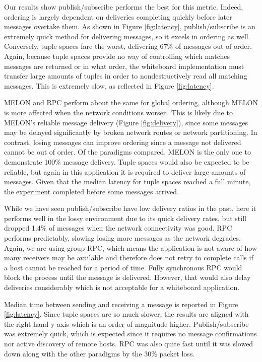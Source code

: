 Our results show publish/subscribe performs the best for this metric. Indeed, ordering is largely dependent on deliveries completing quickly before later messages overtake them. As shown in Figure \ref{fig:latency}, publish/subscribe is an extremely quick method for delivering messages, so it excels in ordering as well. Conversely, tuple spaces fare the worst, delivering 67\% of messages out of order. Again, because tuple spaces provide no way of controlling which matches messages are returned or in what order, the whiteboard implementation must transfer large amounts of tuples in order to nondestructively read all matching messages. This is extremely slow, as reflected in Figure \ref{fig:latency}.

MELON and RPC perform about the same for global ordering, although MELON is more affected when the network conditions worsen. This is likely due to MELON's reliable message delivery (Figure \ref{fig:delivery}), since some messages may be delayed significantly by broken network routes or network partitioning. In contrast, losing messages can improve ordering since a message not delivered cannot be out of order. Of the paradigms compared, MELON is the only one to demonstrate 100\% message delivery. Tuple spaces would also be expected to be reliable, but again in this application it is required to deliver large amounts of messages. Given that the median latency for tuple spaces reached a full minute, the experiment completed before some messages arrived.

While we have seen publish/subscribe have low delivery ratios in the past\cite{collins2010quantitative}, here it performs well in the lossy environment due to its quick delivery rates, but still dropped 1.4\% of messages when the network connectivity was good. RPC performs predictably, slowing losing more messages as the network degrades. Again, we are using group RPC, which means the application is not aware of how many receivers may be available and therefore does not retry to complete calls if a host cannot be reached for a period of time. Fully synchronous RPC would block the process until the message is delivered. However, that would also delay deliveries considerably which is not acceptable for a whiteboard application.

Median time between sending and receiving a message is reported in Figure \ref{fig:latency}. Since tuple spaces are so much slower, the results are aligned with the right-hand y-axis which is an order of magnitude higher. Publish/subscribe was extremely quick, which is expected since it requires no message confirmations nor active discovery of remote hosts. RPC was also quite fast until it was slowed down along with the other paradigms by the 30\% packet loss.

